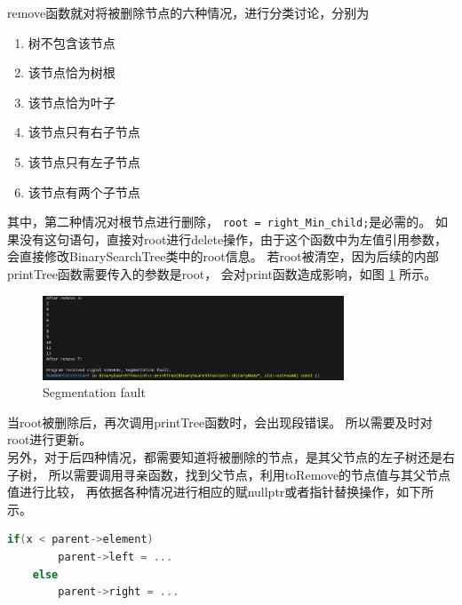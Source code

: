\documentclass[UTF8]{ctexart}
\begin{document}
    remove函数就对将被删除节点的六种情况，进行分类讨论，分别为
    \begin{enumerate}
        \item 树不包含该节点
        \item 该节点恰为树根
        \item 该节点恰为叶子
        \item 该节点只有右子节点
        \item 该节点只有左子节点
        \item 该节点有两个子节点
    \end{enumerate}
    其中，第二种情况对根节点进行删除，
    \lstinline|root = right_Min_child;|是必需的。
    如果没有这句语句，直接对root进行delete操作，由于这个函数中为左值引用参数，
    会直接修改BinarySearchTree类中的root信息。
    若root被清空，因为后续的内部printTree函数需要传入的参数是root，
    会对print函数造成影响，如图 \ref{fig:Segmentation fault} 所示。
    \begin{figure}[H]
        \centering
        \includegraphics[width=0.8\textwidth]{Segmentation_fault.png}
        \caption{Segmentation fault}
        \label{fig:Segmentation fault}
    \end{figure}
    当root被删除后，再次调用printTree函数时，会出现段错误。
    所以需要及时对root进行更新。\\
    另外，对于后四种情况，都需要知道将被删除的节点，是其父节点的左子树还是右子树，
    所以需要调用寻亲函数，找到父节点，利用toRemove的节点值与其父节点值进行比较，
    再依据各种情况进行相应的赋nullptr或者指针替换操作，如下所示。\\
    \begin{lstlisting}[language=C++]
        if(x < parent->element)
        parent->left = ...
    else
        parent->right = ...
    \end{lstlisting}
\end{document}

